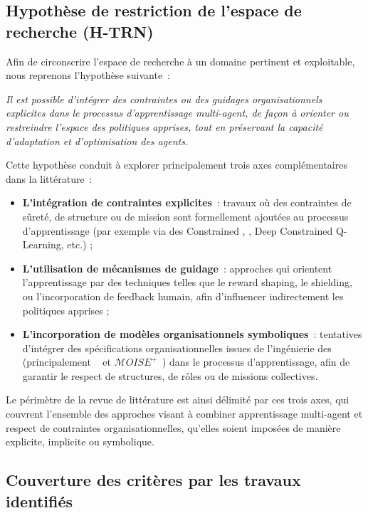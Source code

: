 \subsection*{Hypothèse de restriction de l'espace de recherche (\textbf{H-TRN})}

Afin de circonscrire l'espace de recherche à un domaine pertinent et exploitable, nous reprenons l'hypothèse suivante~:

\textit{Il est possible d'intégrer des contraintes ou des guidages organisationnels explicites dans le processus d'apprentissage multi-agent, de façon à orienter ou restreindre l'espace des politiques apprises, tout en préservant la capacité d'adaptation et d'optimisation des agents.}

Cette hypothèse conduit à explorer principalement trois axes complémentaires dans la littérature~:
\begin{itemize}
  \item \textbf{L'intégration de contraintes explicites}~: travaux où des contraintes de sûreté, de structure ou de mission sont formellement ajoutées au processus d'apprentissage (par exemple via des Constrained , , Deep Constrained Q-Learning, etc.) ;
  \item \textbf{L'utilisation de mécanismes de guidage}~: approches qui orientent l'apprentissage par des techniques telles que le reward shaping, le shielding, ou l'incorporation de feedback humain, afin d'influencer indirectement les politiques apprises ;
  \item \textbf{L'incorporation de modèles organisationnels symboliques}~: tentatives d'intégrer des spécifications organisationnelles issues de l'ingénierie des  (principalement ~\cite{Ferber2004} et $\mathcal{M}OISE^+$~\cite{hubner2002moise}) dans le processus d'apprentissage, afin de garantir le respect de structures, de rôles ou de missions collectives.
\end{itemize}

Le périmètre de la revue de littérature est ainsi délimité par ces trois axes, qui couvrent l'ensemble des approches visant à combiner apprentissage multi-agent et respect de contr\-aintes organisationnelles, qu'elles soient imposées de manière explicite, implicite ou symbolique.

\subsection*{Couverture des critères par les travaux identifiés}

